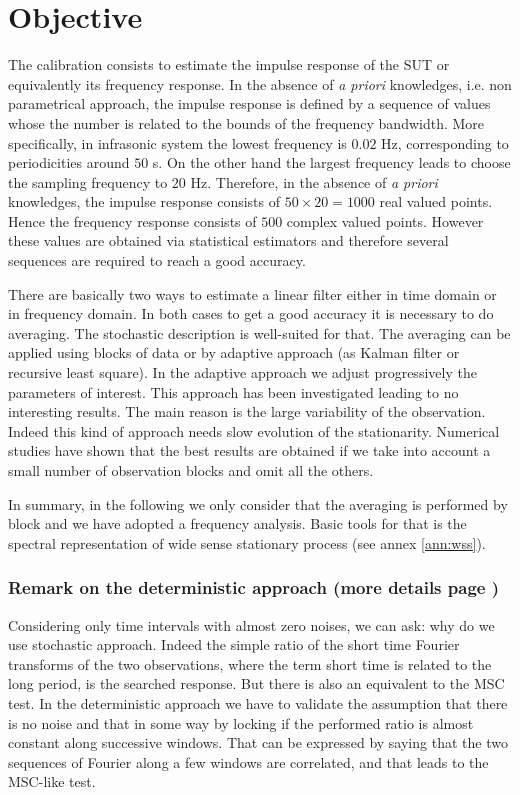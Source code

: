 \section{Objective}
The calibration consists to estimate the impulse response of the SUT or equivalently its frequency response. In the absence of {\it a priori} knowledges, i.e. non parametrical approach, the impulse response is defined by a sequence of values whose the number is related to the bounds of the frequency bandwidth. More specifically, in infrasonic system the lowest frequency is $0.02$ Hz, corresponding to periodicities around $50$ s. On the other hand the largest frequency leads to choose the sampling frequency to $20$ Hz. Therefore, in the absence of {\it a priori} knowledges, the impulse response consists of $50\times 20=1000$ real valued points. Hence the frequency response consists of $500$ complex valued points. However these values are obtained via statistical estimators and therefore several sequences  are required to reach a good accuracy.

There are basically two ways to estimate a linear filter either in time domain or in frequency domain. In both cases to get a good accuracy it is necessary to do averaging. The stochastic description is well-suited for that. The averaging can be applied using blocks of data or by adaptive approach (as Kalman filter or recursive least square). In the adaptive approach we adjust progressively the parameters of interest. This approach has been investigated leading to no interesting results. The main reason is the large variability of the observation. Indeed this kind of approach needs slow evolution of the stationarity. Numerical studies have shown that the best results are obtained if we take into account a small number of observation blocks and omit all the others.

In summary, in the following we only consider that the averaging is performed by block and we have adopted a frequency analysis. Basic tools for that is the spectral representation of wide sense stationary process (see annex \ref{ann:wss}).




\subsubsection{Remark on the deterministic approach (more details page \pageref{ann:deterministic-approach})}
Considering only time intervals with almost zero noises, we can ask: why do we use stochastic approach. Indeed the simple ratio of the short time Fourier transforms of the two observations, where the term short time is related to the long period, is the searched response. But there is also an equivalent to the MSC test. In the deterministic approach we have to validate the assumption that there is no noise and that in some way by locking if the performed ratio is almost constant along successive windows. That can be expressed by saying that the two sequences of Fourier along a few windows are correlated, and that leads to the MSC-like test.


